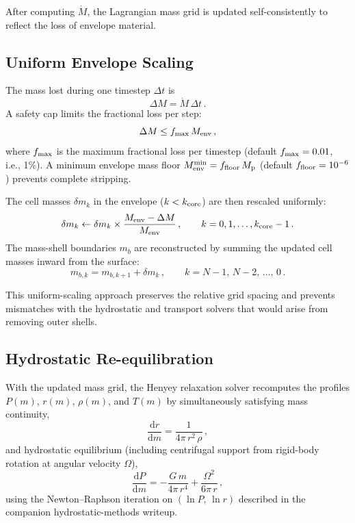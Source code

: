 \documentclass{aastex701}
\newcommand{\dd}{\mathrm{d}}
\newcommand{\Mdot}{\dot{M}}
\newcommand{\Menv}{M_{\rm env}}
\newcommand{\Mp}{M_{\rm p}}
\begin{document}
After computing $\Mdot$, the Lagrangian mass grid is updated
self-consistently to reflect the loss of envelope material.

\subsection{Uniform Envelope Scaling}\label{subsec:scaling}

The mass lost during one timestep $\Delta t$ is
\begin{equation}\label{eq:dM}
  \Delta M = \Mdot\,\Delta t\,.
\end{equation}
A safety cap limits the fractional loss per step:
\begin{equation}
  \Delta M \le f_{\rm max}\,\Menv\,,
\end{equation}
where $f_{\rm max}$ is the maximum fractional loss per timestep (default
$f_{\rm max} = 0.01$, i.e., 1\%).
A minimum envelope mass floor $\Menv^{\rm min} = f_{\rm floor}\,\Mp$
(default $f_{\rm floor} = 10^{-6}$) prevents complete stripping.

The cell masses $\delta m_{k}$ in the envelope ($k < k_{\rm core}$) are
then rescaled uniformly:
\begin{equation}\label{eq:scale}
  \delta m_{k} \leftarrow \delta m_{k}
    \times \frac{\Menv - \Delta M}{\Menv}\,,
  \qquad k = 0,1,\ldots,k_{\rm core}-1\,.
\end{equation}
The mass-shell boundaries $m_{b}$ are reconstructed by summing the
updated cell masses inward from the surface:
\begin{equation}
  m_{b,k} = m_{b,k+1} + \delta m_{k}\,,
  \qquad k = N{-}1,\,N{-}2,\,\ldots,\,0\,.
\end{equation}

This uniform-scaling approach preserves the relative grid spacing
and prevents mismatches with the hydrostatic and transport solvers
that would arise from removing outer shells.

\subsection{Hydrostatic Re-equilibration}\label{subsec:hse}

With the updated mass grid, the Henyey relaxation solver
recomputes the profiles $P(m)$, $r(m)$, $\rho(m)$, and $T(m)$ by
simultaneously satisfying mass continuity,
\begin{equation}
  \frac{\dd r}{\dd m} = \frac{1}{4\pi\,r^{2}\,\rho}\,,
\end{equation}
and hydrostatic equilibrium (including centrifugal support from
rigid-body rotation at angular velocity $\Omega$),
\begin{equation}
  \frac{\dd P}{\dd m}
  = -\frac{G\,m}{4\pi\,r^{4}}
    + \frac{\Omega^{2}}{6\pi\,r}\,,
\end{equation}
using the Newton--Raphson iteration on $(\ln P,\,\ln r)$ described in the
companion hydrostatic-methods writeup.
\end{document}
